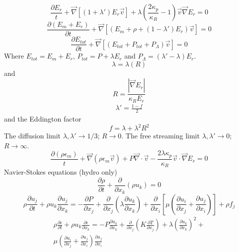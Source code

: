 \documentclass[12pt, a4paper]{article}
\begin{document}
\begin{equation}
    \frac{\partial E_r}{t}+\vec \nabla[(1+\lambda')E_r\vec v]+\lambda(\frac{2\kappa_p}{\kappa_R}-1)\vec v \vec \nabla E_r =0
\end{equation}
\begin{equation}
    \frac{\partial(E_m+E_r)}{\partial t}+\vec\nabla[(E_m+\rho+(1-\lambda')E_r)\vec v]=0
\end{equation}
\begin{equation}
    \frac{\partial E_{tot}}{\partial t}+\vec \nabla[(E_{tot}+P_{tot}+P_{\Lambda})\vec v]=0
\end{equation}
Where $E_{tot}=E_m+E_r$, $P_{tot}=P+\lambda E_r$ and $P_\Lambda=(\lambda'-\lambda)E_r$.
\begin{equation}
    \lambda=\lambda(R)
\end{equation}
and
\begin{equation}
    R=\frac{| \vec \nabla E_r |}{\kappa_R E_r}
\end{equation}
\begin{eqnarray}
    \lambda'=\frac{1-f}{2}
\end{eqnarray}
and the Eddington factor
\begin{equation}
    f=\lambda+\lambda^2 R^2
\end{equation}
The diffusion limit $\lambda,\lambda'\rightarrow 1/3$; $R\rightarrow 0$.
The free streaming limit $\lambda,\lambda'\rightarrow 0$; $R\rightarrow \infty$.
\begin{equation}
    \frac{\partial (\rho \epsilon_m)}{t}+\vec\nabla(\rho\epsilon_m\vec v)+P\vec\nabla\cdot\vec v -\frac{2\lambda\kappa_p}{\kappa_R}\vec v \cdot \vec \nabla E_r = 0
\end{equation}
Navier-Stokes equations (hydro only)
\begin{equation}
    \frac{\partial \rho}{\partial t} + \frac{\partial}{\partial x_k}(\rho u_k) = 0
\end{equation}
\begin{equation}
    \rho\frac{\partial u_j}{\partial t}+\rho u_k \frac{\partial u_j}{\partial x_k} = -\frac{\partial P}{\partial x_j} +\frac{\partial}{\partial x_j} \left( \lambda\frac{\partial u_k}{\partial x_k} \right) + \frac{\partial}{\partial x_i}\left[ \mu \left( \frac{\partial u_i}{\partial x_j}+\frac{\partial u_j}{\partial x_i} \right) \right] + \rho f_j
\end{equation}
\begin{multline}
    \rho\frac{\partial \epsilon}{\partial t} + \rho u_k \frac{\partial \epsilon}{\partial x_k} = -P\frac{\partial u_k}{\partial x_k} + \frac{\partial}{\partial x_j}\left( K\frac{\partial T}{\partial x_j} \right) + \lambda \left( \frac{\partial u_k}{\partial x_k} \right)^2 + \\ \mu \left( \frac{\partial u_i}{\partial x_j}+\frac{\partial u_j}{\partial x_i} \right) \frac{\partial u_j}{\partial x_i}
\end{multline}
\end{document}
